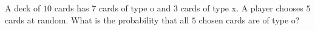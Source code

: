 A deck of $10$ cards has $7$ cards of type o and $3$ cards of type x. A player chooses $5$ cards at random. What is the probability that all $5$ chosen cards are of type o?

